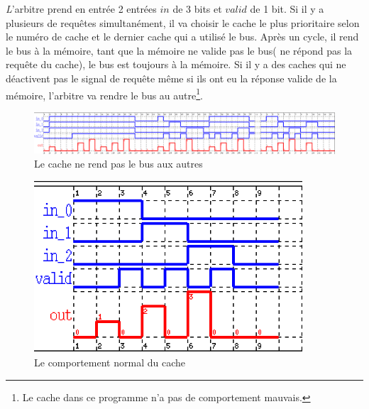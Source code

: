 \documentclass[a4paper,11pt]{report}
\begin{document}
	{\huge \itshape L}'arbitre prend en entrée 2 entrées $in$ de 3 bits et $valid$ de 1 bit. Si il y a plusieurs de requêtes simultanément, il va choisir le cache le plus prioritaire selon le numéro de cache et le dernier cache qui a utilisé le bus. Après un cycle, il rend le bus à la mémoire, tant que la mémoire ne valide pas le bus( ne répond pas la requête du cache), le bus est toujours à la mémoire. Si il y a des caches qui ne déactivent pas le signal de requête même si ils ont eu la réponse valide de la mémoire, l'arbitre va rendre le bus au autre\footnote{Le cache dans ce programme n'a pas de comportement mauvais.}.	
	
	\begin{figure}[!htbp]
		\includegraphics[width = 16cm]{arb_diag_1.png}
		\caption{Le cache ne rend pas le bus aux autres}
	\end{figure}
	
	\begin{figure}[!htbp]
		\centering
		\includegraphics[width = 10cm]{arb_diag_2.png}
		\caption{Le comportement normal du cache}
	\end{figure}
	
\end{document}
